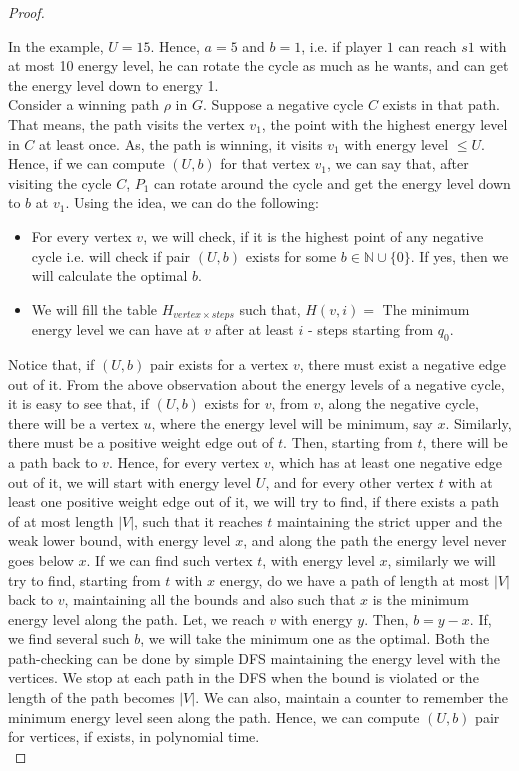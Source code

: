 \begin{proof}
  \begin{figure}[htb]
  \label{energy-negativecycle}
  
  \end{figure}
  \vskip 0.1cm
  In the example, $U=15$. Hence, $a=5$ and $b=1$, i.e. if player $1$ can reach $s1$ with at most 10 energy level, he can rotate the cycle as much as he wants, and can get the energy level down to energy 1.\\
  Consider a winning path $\rho$ in $G$. Suppose a negative cycle $C$ exists in that path. That means, the path visits the vertex $v_1$, the point with the highest energy level in $C$ at least once. As, the path is winning, it visits $v_1$ with energy level $\leq U$. Hence, if we can compute $(U,b)$ for that vertex $v_1$, we can say that, after visiting the cycle $C$, $P_1$ can rotate around the cycle and get the energy level down to $b$ at $v_1$. Using the idea, we can do the following:\\
  \begin{itemize}
  \item For every vertex $v$, we will check, if it is the highest point of any negative cycle i.e. will check if pair $(U,b)$ exists for some $b \in \mathbb{N} \cup \{0\}$. If yes, then we will calculate the optimal $b$.
  \item We will fill the table $H_{vertex \times steps}$ such that, $H(v,i)=$ The minimum energy level we can have at $v$ after at least $i$ - steps starting from $q_0$. 
  \end{itemize}
  \vskip 0.1cm
  Notice that, if $(U,b)$ pair exists for a vertex $v$, there must exist a negative edge out of it. From the above observation about the energy levels of a negative cycle, it is easy to see that, if $(U,b)$ exists for $v$, from $v$, along the negative cycle, there will be a vertex $u$, where the energy level will be minimum, say $x$. Similarly, there must be a positive weight edge out of $t$. Then, starting from $t$, there will be a path back to $v$. Hence, for every vertex $v$, which has at least one negative edge out of it, we will start with energy level $U$, and for every other vertex $t$ with at least one positive weight edge out of it, we will try to find, if there exists a path of at most length $|V|$, such that it reaches $t$ maintaining the strict upper and the weak lower bound, with energy level $x$, and along the path the energy level never goes below $x$. If we can find such vertex $t$, with energy level $x$, similarly we will try to find, starting from $t$ with $x$ energy, do we have a path of length at most $|V|$ back to $v$, maintaining all the bounds and also such that $x$ is the minimum energy level along the path. Let, we reach $v$ with energy $y$. Then, $b=y-x$. If, we find several such $b$, we will take the minimum one as the optimal. Both the path-checking can be done by simple DFS maintaining the energy level with the vertices. We stop at each path in the DFS when the bound is violated or the length of the path becomes $|V|$. We can also, maintain a counter to remember the minimum energy level seen along the path. Hence, we can compute $(U,b)$ pair for vertices, if exists, in polynomial time.\\

\end{proof}

